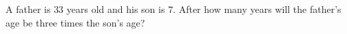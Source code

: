 A father is $33$ years old and his son is $7$. After how many years will the father's age be three times the son's age?
